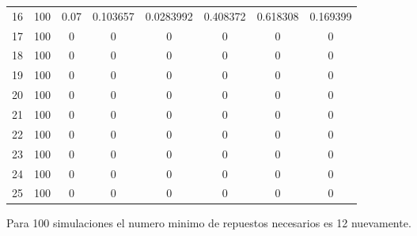 \begin{table}[h]
{\begin{tabular}{|c|c|c|c|c|c|c|c|}
16 & 100 & 0.07 & 0.103657 & 0.0283992 & 0.408372 & 0.618308 & 0.169399 \\
17 & 100 & 0 & 0 & 0 & 0 & 0 & 0 \\
18 & 100 & 0 & 0 & 0 & 0 & 0 & 0 \\
19 & 100 & 0 & 0 & 0 & 0 & 0 & 0 \\
20 & 100 & 0 & 0 & 0 & 0 & 0 & 0 \\
21 & 100 & 0 & 0 & 0 & 0 & 0 & 0 \\
22 & 100 & 0 & 0 & 0 & 0 & 0 & 0 \\
23 & 100 & 0 & 0 & 0 & 0 & 0 & 0 \\
24 & 100 & 0 & 0 & 0 & 0 & 0 & 0 \\
25 & 100 & 0 & 0 & 0 & 0 & 0 & 0 \\ \hline
\end{tabular}%
}
\end{table}

Para 100 simulaciones el numero minimo de repuestos necesarios es 12 nuevamente.

\newpage

